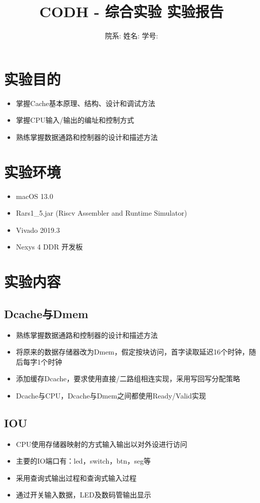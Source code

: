 \documentclass[a4paper]{article}
\title{\heiti 
CODH - 综合实验 \hspace{0.3cm}实验报告}
\author{院系: \kaishu\underline{}\hspace{1.5cm}姓名: \kaishu \underline{}\hspace{1.5cm}学号: \kaishu \underline{}\hspace{1.5cm}}
\begin{document}
\maketitle

\section{实验目的}
\begin{itemize}
    \item 掌握Cache基本原理、结构、设计和调试方法
    \item 掌握CPU输入/输出的编址和控制方式
    \item 熟练掌握数据通路和控制器的设计和描述方法
    
\end{itemize}

\section{实验环境}
\begin{itemize}
  \item macOS 13.0
  \item Rars1\_5.jar (Riscv Assembler and Runtime Simulator)
  \item Vivado 2019.3
  \item Nexys 4 DDR 开发板
\end{itemize}
\section{实验内容}
\subsection{Dcache与Dmem}
\begin{itemize}
    \item 熟练掌握数据通路和控制器的设计和描述方法
    \item 将原来的数据存储器改为Dmem，假定按块访问，首字读取延迟16个时钟，随后每字1个时钟
    \item 添加缓存Dcache，要求使用直接/二路组相连实现，采用写回写分配策略
    \item Dcache与CPU，Dcache与Dmem之间都使用Ready/Valid实现
\end{itemize}

  \subsection{IOU}
  \begin{itemize}
    \item CPU使用存储器映射的方式输入输出以对外设进行访问
    \item 主要的IO端口有：led，switch，btn，seg等
    \item 采用查询式输出过程和查询式输入过程
    \item 通过开关输入数据，LED及数码管输出显示
  \end{itemize}
\end{document}
